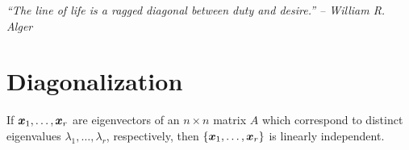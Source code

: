 \begin{center} 
\emph{``The line of life is a ragged diagonal between duty and desire.'' -- William R. Alger}
\end{center}

\section{Diagonalization}\label{sec:diagonable}
\begin{Thm} If $\boldsymbol x_1, \ldots,  \boldsymbol x_r$ are eigenvectors of an $n\times n$ matrix $A$ which correspond to distinct eigenvalues $\lambda_1, \ldots, \lambda_r$, respectively, then $\{\boldsymbol x_1, \ldots, \boldsymbol x_r\}$ is linearly independent.
\end{Thm}\vs
%
%

